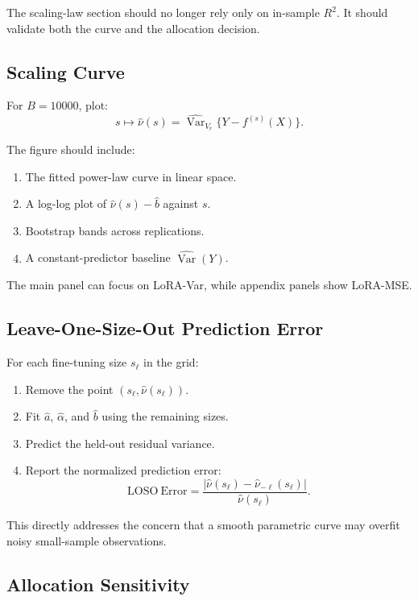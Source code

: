 \documentclass[11pt]{article}
\begin{document}
The scaling-law section should no longer rely only on in-sample $R^2$. It should validate both the curve and the allocation decision.

\subsection{Scaling Curve}

For $B=10000$, plot:
\[
s\mapsto \widehat{\nu}(s)=\widehat{\operatorname{Var}}_{V_r}\{Y-f^{(s)}(X)\}.
\]

The figure should include:

\begin{enumerate}
    \item The fitted power-law curve in linear space.
    \item A log-log plot of $\widehat\nu(s)-\hat b$ against $s$.
    \item Bootstrap bands across replications.
    \item A constant-predictor baseline $\widehat{\operatorname{Var}}(Y)$.
\end{enumerate}

The main panel can focus on LoRA-Var, while appendix panels show LoRA-MSE.

\subsection{Leave-One-Size-Out Prediction Error}

For each fine-tuning size $s_\ell$ in the grid:

\begin{enumerate}
    \item Remove the point $(s_\ell,\widehat\nu(s_\ell))$.
    \item Fit $\hat a$, $\hat\alpha$, and $\hat b$ using the remaining sizes.
    \item Predict the held-out residual variance.
    \item Report the normalized prediction error:
    \[
    \mathrm{LOSO\ Error}
    =
    \frac{|\widehat\nu(s_\ell)-\widehat\nu_{-\ell}(s_\ell)|}
    {\widehat\nu(s_\ell)}.
    \]
\end{enumerate}

This directly addresses the concern that a smooth parametric curve may overfit noisy small-sample observations.

\subsection{Allocation Sensitivity}
\end{document}
